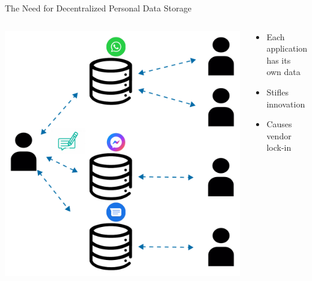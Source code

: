 
\begin{frame}{The Need for Decentralized Personal Data Storage}
    \begin{columns}[T] %
        \begin{column}{0.6\textwidth} %
            \includegraphics[width=.85\linewidth]{images/current-bad-message-situation.pdf} %
        \end{column}

        \begin{column}{0.4\textwidth} %
            \begin{itemize}
                \item Each application has its own data
                \item Stifles innovation
                \item Causes vendor lock-in
            \end{itemize}
        \end{column}
    \end{columns}
\end{frame}


